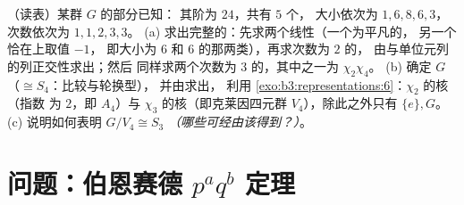 \begin{exercise}[$\star\star$]\label{exo:b3:representations:12}
（读表）某群 $G$ 的部分已知：
其阶为 $24$，共有 $5$ 个，
大小依次为 $1, 6, 8, 6, 3$，次数依次为 $1, 1, 2, 3, 3$。
(a) 求出完整的：先求两个线性（一个为平凡的，
另一个恰在上取值 $-1$，
即大小为 $6$ 和 $6$ 的那两类），再求次数为 $2$ 的，
由与单位元列的列正交性求出；然后
同样求两个次数为 $3$ 的，其中之一为 $\chi_2\chi_4$。
(b) 确定 $G$（$\cong S_4$：比较与轮换型），
并由求出，
利用 \cref{exo:b3:representations:6}：$\chi_2$ 的核（指数
为 $2$，即 $A_4$）与 $\chi_3$ 的核（即克莱因四元群 $V_4$），除此之外只有
$\{e\}, G$。
(c) 说明如何表明 $G/V_4 \cong S_3$
\emph{（哪些可经由该得到？）}。
\end{exercise}

\section{问题：伯恩赛德 \texorpdfstring{$p^aq^b$}{paqb}
定理}


